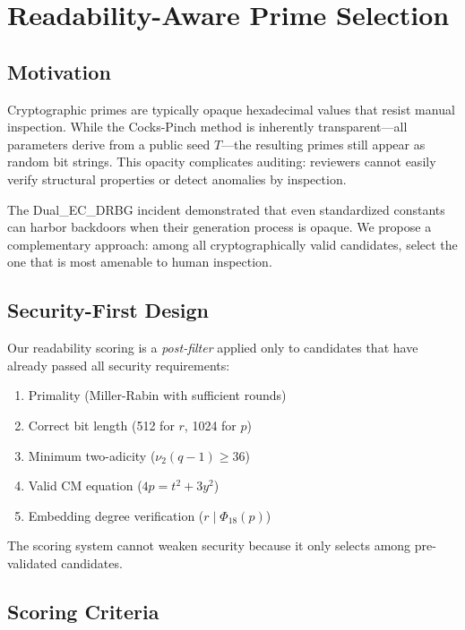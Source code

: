 \section{Readability-Aware Prime Selection}

\subsection{Motivation}\label{motivation}

Cryptographic primes are typically opaque hexadecimal values that resist
manual inspection. While the Cocks-Pinch method is inherently
transparent---all parameters derive from a public seed \(T\)---the
resulting primes still appear as random bit strings. This opacity
complicates auditing: reviewers cannot easily verify structural
properties or detect anomalies by inspection.

The Dual\_EC\_DRBG incident \cite{DualECDRBG} demonstrated that even
standardized constants can harbor backdoors when their generation
process is opaque. We propose a complementary approach: among all
cryptographically valid candidates, select the one that is most amenable
to human inspection.

\subsection{Security-First Design}\label{security-first-design}

Our readability scoring is a \emph{post-filter} applied only to
candidates that have already passed all security requirements:

\begin{enumerate}
\def\labelenumi{\arabic{enumi}.}
\tightlist
\item
  Primality (Miller-Rabin with sufficient rounds)
\item
  Correct bit length (512 for \(r\), 1024 for \(p\))
\item
  Minimum two-adicity (\(\nu_2(q-1) \geq 36\))
\item
  Valid CM equation (\(4p = t^2 + 3y^2\))
\item
  Embedding degree verification (\(r \mid \Phi_{18}(p)\))
\end{enumerate}

The scoring system cannot weaken security because it only selects among
pre-validated candidates.

\subsection{Scoring Criteria}\label{scoring-criteria}

